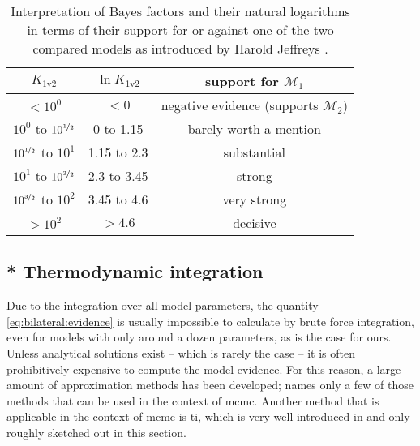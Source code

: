 \documentclass[\relativeRoot/main.tex]{subfiles}
\begin{document}
\begin{table}
    \centering
    \begin{tabular}{ | c | c | c | }
        \hline
        $K_\text{1v2}$ & $\ln{K_\text{1v2}}$ & support for $\mathcal{M}_1$ \\
        \hline
        $< 10^0$ & $< 0$ & negative evidence (supports $\mathcal{M}_2$) \\
        $10^0$ to $10^{\nicefrac{1}{2}}$ & 0 to 1.15 & barely worth a mention \\
        $10^{\nicefrac{1}{2}}$ to $10^1$ & 1.15 to 2.3 & substantial \\
        $10^1$ to $10^{\nicefrac{3}{2}}$ & 2.3 to 3.45 & strong \\
        $10^{\nicefrac{3}{2}}$ to $10^2$ & 3.45 to 4.6 & very strong \\
        $> 10^2$ & $> 4.6$ & decisive \\
        \hline
    \end{tabular}
    \caption{Interpretation of Bayes factors and their natural logarithms in terms of their support for or against one of the two compared models as introduced by Harold Jeffreys \cite{jeffreys_theory_1998}.}
    \label{table:bilateral:model_comp:bayes_factor}
\end{table}

\subsection{* Thermodynamic integration}
\label{subsec:bilateral:model_comp:thermo_int}

Due to the integration over all model parameters, the quantity \cref{eq:bilateral:evidence} is usually impossible to calculate by brute force integration, even for models with only around a dozen parameters, as is the case for ours. Unless analytical solutions exist -- which is rarely the case -- it is often prohibitively expensive to compute the model evidence. For this reason, a large amount of approximation methods has been developed; \cite{friel_estimating_2011} names only a few of those methods that can be used in the context of \gls{mcmc}. Another method that is applicable in the context of \gls{mcmc} is \gls{ti}, which is very well introduced in \cite{aponte_introduction_2022} and only roughly sketched out in this section.
\end{document}
